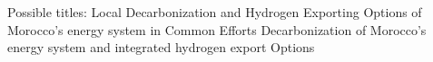 Possible titles:
Local Decarbonization and Hydrogen Exporting Options of Morocco's energy system in Common Efforts
Decarbonization of Morocco's energy system and integrated hydrogen export Options